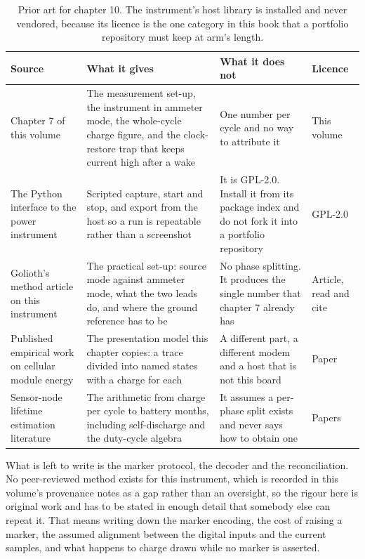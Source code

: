 \begin{table}[H]\centering\small
\begin{tabular}{p{34mm}p{46mm}p{38mm}p{20mm}}
\toprule
Source & What it gives & What it does not & Licence \\
\midrule
Chapter 7 of this volume & The measurement set-up, the instrument in ammeter mode, the whole-cycle charge figure, and the clock-restore trap that keeps current high after a wake & One number per cycle and no way to attribute it & This volume \\
The Python interface to the power instrument & Scripted capture, start and stop, and export from the host so a run is repeatable rather than a screenshot & It is GPL-2.0. Install it from its package index and do not fork it into a portfolio repository & GPL-2.0 \\
Golioth's method article on this instrument & The practical set-up: source mode against ammeter mode, what the two leads do, and where the ground reference has to be & No phase splitting. It produces the single number that chapter 7 already has & Article, read and cite \\
Published empirical work on cellular module energy & The presentation model this chapter copies: a trace divided into named states with a charge for each & A different part, a different modem and a host that is not this board & Paper \\
Sensor-node lifetime estimation literature & The arithmetic from charge per cycle to battery months, including self-discharge and the duty-cycle algebra & It assumes a per-phase split exists and never says how to obtain one & Papers \\
\bottomrule
\end{tabular}
\caption{Prior art for chapter 10. The instrument's host library is installed and never vendored, because its licence is the one category in this book that a portfolio repository must keep at arm's length.}
\end{table}

What is left to write is the marker protocol, the decoder and the
reconciliation. No peer-reviewed method exists for this instrument, which is
recorded in this volume's provenance notes as a gap rather than an oversight, so
the rigour here is original work and has to be stated in enough detail that
somebody else can repeat it. That means writing down the marker encoding, the
cost of raising a marker, the assumed alignment between the digital inputs and
the current samples, and what happens to charge drawn while no marker is
asserted.

